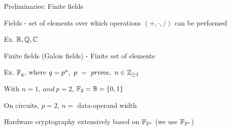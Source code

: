 
\begin{frame}{\large Preliminaries: Finite fields}
\bi
	\item Fields - set of elements over which operations $(+,\cdot,/)$ can be performed 
	\bi
		\item Ex. ${\mathbb{R}},{\mathbb{Q}},{\mathbb{C}}$
	\ei
	\pause
	\vspace{0.1in}
	\item Finite fields (Galois fields) - Finite set of elements
	\bi
		\pause
		\item Ex. ${\mathbb{F}}_q$, where $q=p^n,~p~=~prime,~n \in {\mathbb{Z}}_{\geq 1}$ 
		\bi
		\item With $n=1,~and~p=2$, ${\mathbb{F}}_2 = {\mathbb{B}} = \{0,1\}$
		\ei
		\pause
		\item On circuits, $p=2$, $n=$ data-operand width
	\ei
	\pause
	\vspace{0.1in}
	\item Hardware cryptography extensively based on ${\mathbb{F}}_{2^n}$ (we use ${\mathbb{F}}_{2^n}$)
\ei
\end{frame}

